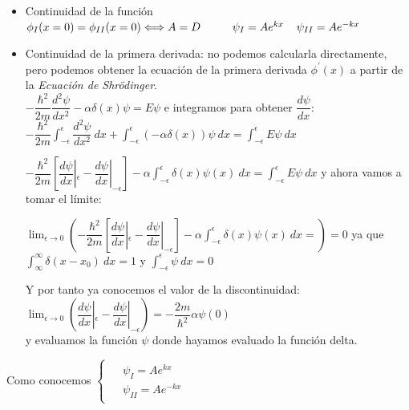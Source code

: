 \documentclass{report}
\begin{document}
    \begin{itemize}
      \item Continuidad de la función $\phi_I(x=0)=\phi_{II}(x=0)\Longleftrightarrow
            A=D\hspace{1cm}\psi_I=Ae^{kx}\hspace{0.4cm}\psi_{II}=Ae^{-kx}$
      \item Continuidad de la primera derivada: no podemos calcularla directamente,
            pero podemos obtener la ecuación de la primera derivada $\phi^\prime (x)$
            a partir de la \textit{Ecuación de Shrödinger}.\\
            $-\dfrac{\hbar^2}{2m}\dfrac{d^2\psi}{dx^2}-\alpha\delta(x)\psi=E\psi$ e 
            integramos para obtener $\dfrac{d\psi}{dx}$:
            $-\dfrac{\hbar^2}{2m}\displaystyle\int_{-\epsilon}^{\epsilon}\dfrac{d^2\psi}{dx^2}\ dx
            +\displaystyle\int_{-\epsilon}^{\epsilon}(-\alpha\delta(x))\psi\ dx=
            \displaystyle\int_{-\epsilon}^{\epsilon}E\psi\ dx$
            
            $-\dfrac{\hbar^2}{2m}\left[\dfrac{d\psi}{dx}|_\epsilon-\dfrac{d\psi}{dx}|_{-\epsilon}\right]
            -\alpha\displaystyle\int_{-\epsilon}^{\epsilon}\delta(x)\psi(x)\ dx=
            \displaystyle\int_{-\epsilon}^{\epsilon}E\psi\ dx$ y ahora vamos a tomar
            el límite:

            $\displaystyle\lim_{\epsilon\rightarrow 0}\left(-\dfrac{\hbar^2}{2m}\left[\dfrac{d\psi}{dx}|_\epsilon-
            \dfrac{d\psi}{dx}|_{-\epsilon}\right]-\alpha\displaystyle\int_{-\epsilon}^{\epsilon}
            \delta(x)\psi(x)\ dx=\right)=0$ ya que $\displaystyle\int_{\infty}^{\infty}\delta(x-x_0)\ dx=1$ y 
            $\displaystyle\int_{-\epsilon}^{\epsilon}\psi\ dx=0$ 

            Y por tanto ya conocemos el valor de la discontinuidad:
            $\displaystyle\lim_{\epsilon\rightarrow 0}\left(\dfrac{d\psi}{dx}|_\epsilon-
            \dfrac{d\psi}{dx}|_{-\epsilon}\right)=-\dfrac{2m}{\hbar^2}\alpha\psi(0)$ \\
            y evaluamos la función $\psi$ donde hayamos evaluado la función delta.
    \end{itemize}
    Como conocemos 
            $\begin{cases}
              \begin{aligned}
                &\psi_{I}=Ae^{kx}\\
                &\psi_{II}=Ae^{-kx}
              \end{aligned}
            \end{cases}$\hspace{-0.3cm}
\end{document}
